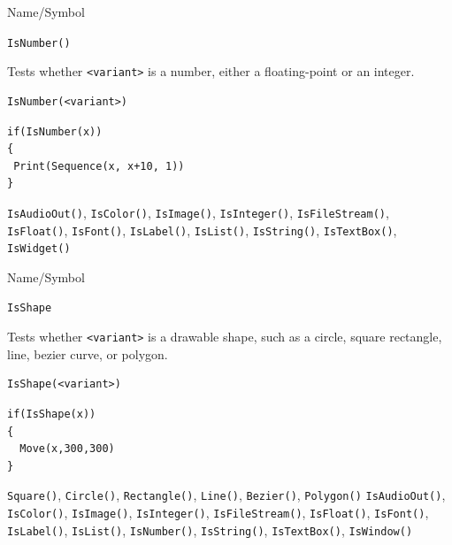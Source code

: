 \begin{desc}{Name/Symbol}
\item[Name/Symbol]	\verb+IsNumber()+

\item[Description]	Tests whether \verb+<variant>+ is a number, either a
		floating-point or an integer.

\item[Usage]		
\begin{verbatim}
IsNumber(<variant>)
\end{verbatim}

\item[Example]	
\begin{verbatim}
if(IsNumber(x))
{
 Print(Sequence(x, x+10, 1))
}
\end{verbatim}

\item[See Also] \verb+IsAudioOut()+, \verb+IsColor()+,
  \verb+IsImage()+, \verb+IsInteger()+, \verb+IsFileStream()+,
  \verb+IsFloat()+, \verb+IsFont()+, \verb+IsLabel()+,
  \verb+IsList()+, \verb+IsString()+, \verb+IsTextBox()+,
  \verb+IsWidget()+
\end{desc}

\begin{desc}{Name/Symbol}
\item[Name/Symbol]	\verb+IsShape+

\item[Description]	Tests whether \verb+<variant>+ is a drawable
  shape, such as a circle, square rectangle, line, bezier curve, or
  polygon.


\item[Usage]		
\begin{verbatim}
IsShape(<variant>)
\end{verbatim}

\item[Example]	
\begin{verbatim}
if(IsShape(x))
{
  Move(x,300,300)
}
\end{verbatim}

\item[See Also]	\verb+Square()+, \verb+Circle()+,
  \verb+Rectangle()+, \verb+Line()+, \verb+Bezier()+, \verb+Polygon()+ 
 \verb+IsAudioOut()+, \verb+IsColor()+,
  \verb+IsImage()+, \verb+IsInteger()+, \verb+IsFileStream()+,
  \verb+IsFloat()+, \verb+IsFont()+, \verb+IsLabel()+,
  \verb+IsList()+, \verb+IsNumber()+, \verb+IsString()+,
  \verb+IsTextBox()+, \verb+IsWindow()+
\end{desc}

